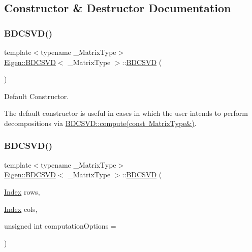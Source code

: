 \subsection{Constructor \& Destructor Documentation}
\mbox{\label{class_eigen_1_1_b_d_c_s_v_d_a39514816d38f9c418cf3f3514b511c2c}} 
\subsubsection{\texorpdfstring{BDCSVD()}{BDCSVD()}\hspace{0.1cm}{\footnotesize\ttfamily [1/3]}}
{\footnotesize\ttfamily template$<$typename \+\_\+\+Matrix\+Type$>$ \\
\mbox{\hyperlink{class_eigen_1_1_b_d_c_s_v_d}{Eigen\+::\+B\+D\+C\+S\+VD}}$<$ \+\_\+\+Matrix\+Type $>$\+::\mbox{\hyperlink{class_eigen_1_1_b_d_c_s_v_d}{B\+D\+C\+S\+VD}} (\begin{DoxyParamCaption}{ }\end{DoxyParamCaption})\hspace{0.3cm}{\ttfamily [inline]}}



Default Constructor. 

The default constructor is useful in cases in which the user intends to perform decompositions via \mbox{\hyperlink{class_eigen_1_1_b_d_c_s_v_d_acf27f41ed044d74ea8e8cbaf17ffdb04}{B\+D\+C\+S\+V\+D\+::compute(const Matrix\+Type\&)}}. \mbox{\label{class_eigen_1_1_b_d_c_s_v_d_a3e1fa48b3d042b7daf7392724a68bb60}} 
\subsubsection{\texorpdfstring{BDCSVD()}{BDCSVD()}\hspace{0.1cm}{\footnotesize\ttfamily [2/3]}}
{\footnotesize\ttfamily template$<$typename \+\_\+\+Matrix\+Type$>$ \\
\mbox{\hyperlink{class_eigen_1_1_b_d_c_s_v_d}{Eigen\+::\+B\+D\+C\+S\+VD}}$<$ \+\_\+\+Matrix\+Type $>$\+::\mbox{\hyperlink{class_eigen_1_1_b_d_c_s_v_d}{B\+D\+C\+S\+VD}} (\begin{DoxyParamCaption}\item[{\mbox{\hyperlink{class_eigen_1_1_s_v_d_base_a6229a37997eca1072b52cca5ee7a2bec}{Index}}}]{rows,  }\item[{\mbox{\hyperlink{class_eigen_1_1_s_v_d_base_a6229a37997eca1072b52cca5ee7a2bec}{Index}}}]{cols,  }\item[{unsigned int}]{computation\+Options = {} }\end{DoxyParamCaption})\hspace{0.3cm}{\ttfamily [inline]}}



